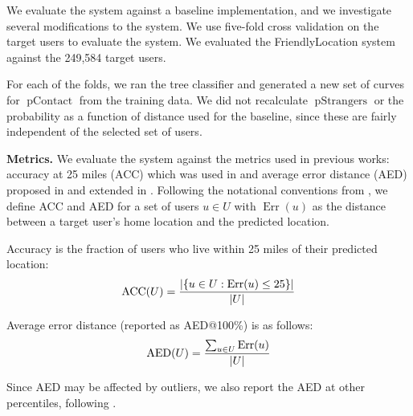 \documentclass[letterpaper]{article}
\DeclareMathOperator{\pContact}{pContact}
\DeclareMathOperator{\pStrangers}{pStrangers}
\DeclareMathOperator{\Err}{Err}
\DeclareMathOperator{\AED}{AED}
\DeclareMathOperator{\ACC}{ACC}
\begin{document}
We evaluate the system against a baseline implementation, and we investigate
several modifications to the system.
%
We use five-fold cross validation on the target users to evaluate the system.
We evaluated the FriendlyLocation system against the 249,584 target users.

For each of the folds, we ran the tree classifier and generated a new set of
curves for $\pContact$ from the training data.
%
We did not recalculate $\pStrangers$ or the probability as a function of distance
used for the baseline, since these are fairly independent of the selected set
of users.

\noindent\textbf{Metrics.} We evaluate the system against the metrics used in previous works:
accuracy at 25 miles (ACC) which was used in \cite{backstrom2010find}
and average error distance (AED) proposed in \cite{cheng2010you} and
extended in \cite{li2012towards}.
%
Following the notational conventions from \cite{li2012towards}, we define ACC
and AED for a set of users $u \in U$ with $\Err(u)$ as the distance between a
target user's home location and the predicted location.

Accuracy is the fraction of users who live within 25 miles of their predicted
location:
\[
    \ACC(U) = { |\{ u \in U : \Err(u)\le25 \}| \over |U| }
\]

Average error distance (reported as AED@100\%) is as follows:
\[
    \AED(U) = { \sum_{u \in U} \Err(u) \over |U| }
\]

Since AED may be affected by outliers, we also report the AED at other percentiles, following \cite{li2012towards}.

\end{document}

